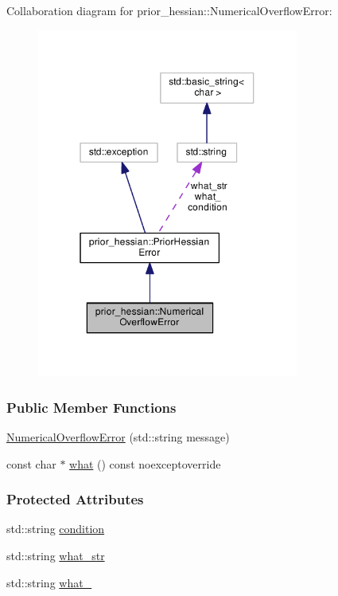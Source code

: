 Collaboration diagram for prior\+\_\+hessian\+:\+:Numerical\+Overflow\+Error\+:\nopagebreak
\begin{figure}[H]
\begin{center}
\leavevmode
\includegraphics[width=244pt]{structprior__hessian_1_1NumericalOverflowError__coll__graph}
\end{center}
\end{figure}
\subsubsection*{Public Member Functions}
\begin{DoxyCompactItemize}
\item 
\hyperlink{structprior__hessian_1_1NumericalOverflowError_a371db702d0acf8a00f090d7c018ef3e0}{Numerical\+Overflow\+Error} (std\+::string message)
\item 
const char $\ast$ \hyperlink{classprior__hessian_1_1PriorHessianError_a0d1812ff85f88f12c0fffd12f523263d}{what} () const noexceptoverride
\end{DoxyCompactItemize}
\subsubsection*{Protected Attributes}
\begin{DoxyCompactItemize}
\item 
std\+::string \hyperlink{classprior__hessian_1_1PriorHessianError_a0f00dbb23dc6ba9b3577503755b018c5}{condition}
\item 
std\+::string \hyperlink{classprior__hessian_1_1PriorHessianError_a0d97e1b6b1bcf6a440400706f416375e}{what\+\_\+str}
\item 
std\+::string \hyperlink{classprior__hessian_1_1PriorHessianError_a018e11b5863c2a3a06d37a16a89b14b2}{what\+\_\+}
\end{DoxyCompactItemize}



